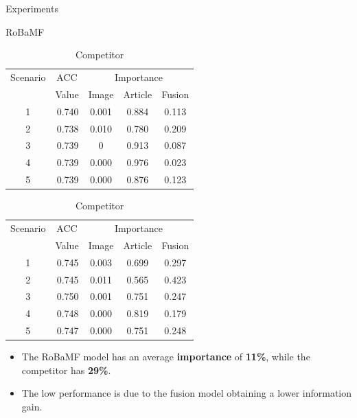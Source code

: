 \documentclass[final]{beamer}
\newlength{\colwidth}
\begin{document}
\begin{frame}[t]
\begin{columns}[t]
\begin{column}{\colwidth}
\begin{block}{Experiments}
    
   \begin{table}[htbp]
    \centering
    \begin{minipage}[t]{0.45\textwidth}
    \centering
    \caption{RoBaMF}
    \label{tab:robamf}
    \begin{tabular}{@{}c|r|ccc@{}}
        \toprule
        \multirow{2.5}{*}{Scenario} & \multicolumn{1}{c|}{ACC} & \multicolumn{3}{c}{Importance} \\
        \cmidrule{2-5}
                 & \multicolumn{1}{c|}{Value} & Image & Article & Fusion \\
        \midrule
        1 & 0.740 & 0.001 & 0.884 & 0.113 \\
        2 & 0.738 & 0.010 & 0.780 & 0.209 \\
        3 & 0.739 & 0 & 0.913 & 0.087 \\
        4 & 0.739 & 0.000 & 0.976 & 0.023 \\
        5 & 0.739 & 0.000 & 0.876 & 0.123 \\
        \bottomrule
    \end{tabular}
    \end{minipage}
    \hfill
    \begin{minipage}[t]{0.45\textwidth}
    \centering
    \caption{Competitor}
    \label{tab:competitor}
    \begin{tabular}{@{}c|r|ccc@{}}
        \toprule
        \multirow{2.5}{*}{Scenario} & \multicolumn{1}{c|}{ACC} & \multicolumn{3}{c}{Importance} \\
        \cmidrule{2-5}
                 & \multicolumn{1}{c|}{Value} & Image & Article & Fusion \\
        \midrule
        1 & 0.745 & 0.003 & 0.699 & 0.297 \\
        2 & 0.745 & 0.011 & 0.565 & 0.423 \\
        3 & 0.750 & 0.001 & 0.751 & 0.247 \\
        4 & 0.748 & 0.000 & 0.819 & 0.179 \\
        5 & 0.747 & 0.000 & 0.751 & 0.248 \\
        \bottomrule
    \end{tabular}
    \end{minipage}
\end{table}

\begin{itemize}
    \item The RoBaMF model has an average \textbf{importance} of \textbf{11\%}, while the competitor has \textbf{29\%}.
    \item The low performance is due to the fusion model obtaining a lower information gain.
    

\end{itemize}
\end{block}
\end{column}
\end{columns}
\end{frame}
\end{document}
